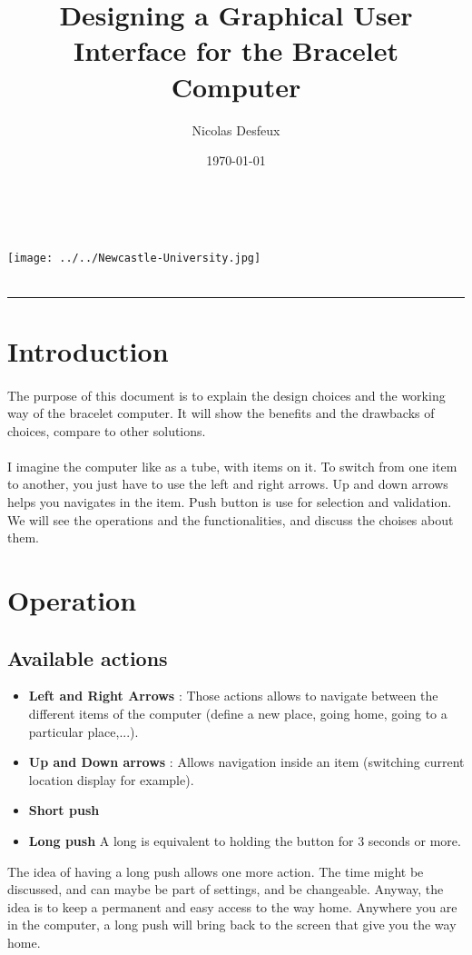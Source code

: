 \documentclass[a4paper,12pt]{article} %
\date{\today}
\author{Nicolas Desfeux}
\title{
\Huge{Designing a Graphical User Interface for the Bracelet Computer
}}
\makeatletter
\def\maketitle{

	\begin{multicols}{2}
		{\@author\\\texttt{\@email}}
		\begin{flushright}
			{\texttt{[image: ../../Newcastle-University.jpg]}}\\
			{\@date}\\
		\end{flushright}
	\end{multicols}
	\vspace{1cm}
	\begin{center}
		{\LARGE \@title}
		\rule{10cm}{1pt}
	\end{center}
	\vspace{1cm}
}
\makeatother
\begin{document}
\maketitle


\section*{Introduction}
\paragraph{}The purpose of this document is to explain the design choices and the working way of the bracelet computer. It will show the benefits and the drawbacks of choices, compare to other solutions. 
\paragraph{}I imagine the computer like as a tube, with items on it. To switch from one item to another, you just have to use the left and right arrows. Up and down arrows helps you navigates in the item. Push button is use for selection and validation. We will see the operations and the functionalities, and discuss the choises about them.

\section{Operation}
\subsection{Available actions}
\begin{itemize}
\item \textbf{Left and Right Arrows} :  Those actions allows to navigate between the different items of the computer (define a new place, going home, going to a particular place,...). 
\item \textbf{Up and Down arrows} : Allows navigation inside an item (switching current location display for example).
\item \textbf{Short push}
\item \textbf{Long push} A long is equivalent to holding the button for 3 seconds or more.
\end{itemize}
The idea of having a long push allows one more action. The time might be discussed, and can maybe be part of settings, and be changeable. Anyway, the idea is to keep a permanent and easy access to the way home. Anywhere you are in the computer, a long push will bring back to the screen that give you the way home.\\
\end{document}
